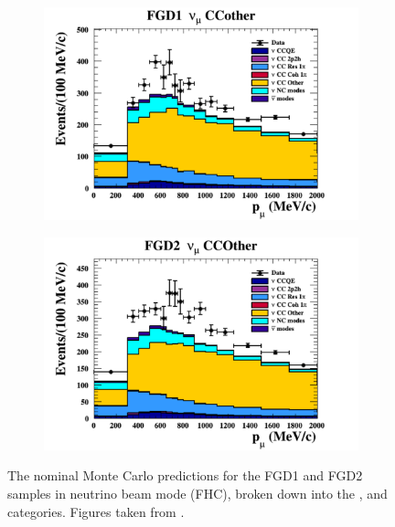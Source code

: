 \begin{figure}[h]
\begin{subfigure}[t]{0.49\textwidth}
    \includegraphics[width=\textwidth, trim={0mm 0mm 0mm 0mm}, clip,page=1]{Figures/Selections/Pmu_1D_modes_FGD1_numuCC_other_Data_prefit.pdf}
  \end{subfigure}%
  \begin{subfigure}[t]{0.49\textwidth}
    \includegraphics[width=\textwidth, trim={0mm 0mm 0mm 0mm}, clip,page=1]{Figures/Selections/Pmu_1D_modes_FGD2_numuCC_other_Data_prefit.pdf}
  \end{subfigure}
  \caption{The nominal Monte Carlo predictions for the FGD1 and FGD2 samples in neutrino beam mode (FHC), broken down into the ,  and  categories. Figures taken from \cite{t2k_tn_395}.}
  \label{fig:SelsAndSysts_Beam_NDPred}
\end{figure}

